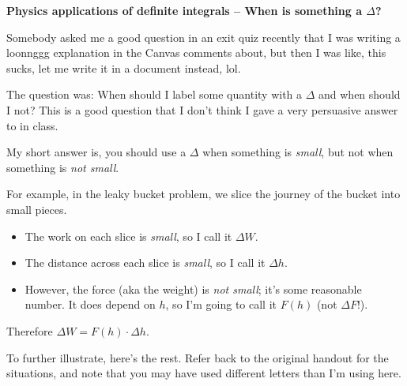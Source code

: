 \documentclass[12pt]{article}
\renewcommand{\section}[1]{\begin{center} \textbf{#1} \\\end{center}}
\begin{document}
%


\allowdisplaybreaks
\section{Physics applications of definite integrals -- When is something a $\Delta$?}
Somebody asked me a good question in an exit quiz recently that I was writing a loonnggg explanation in the Canvas comments about, but then I was like, this sucks, let me write it in a document instead, lol.

The question was: When should I label some quantity with a $\Delta$ and when should I not? This is a good question that I don't think I gave a very persuasive answer to in class.

My short answer is, you should use a $\Delta$ when something is \textit{small}, but not when something is \textit{not small}.

For example, in the leaky bucket problem, we slice the journey of the bucket into small pieces. 
\begin{itemize}
\item The work on each slice is \textit{small}, so I call it \(\Delta W\). 
\item The distance across each slice is \textit{small}, so I call it \(\Delta h\).
\item However, the force (aka the weight) is \textit{not small}; it's some reasonable number. It does depend on \(h\), so I'm going to call it \(F(h)\) (not \(\Delta F\)!).
\end{itemize} Therefore \(\Delta W = F(h) \cdot \Delta h\).

To further illustrate, here's the rest. Refer back to the original handout for the situations, and note that you may have used different letters than I'm using here.

\hrulefill
\end{document}
